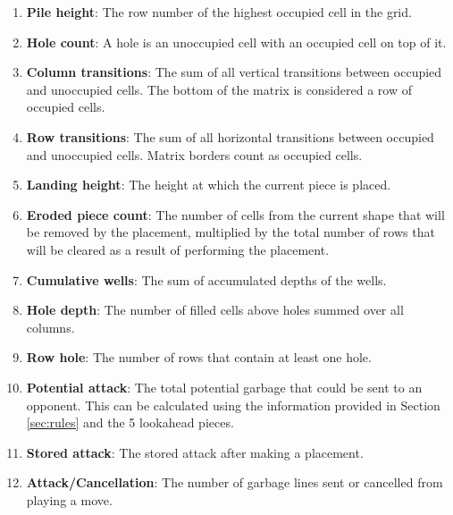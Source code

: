 \documentclass[a4paper, 12pt]{extreport}
\begin{document}
	\begin{enumerate}
		\item \textbf{Pile height}: The row number of the highest occupied cell in the grid.
		\item \textbf{Hole count}: A hole is an unoccupied cell with an occupied cell on top of it.
		\item \textbf{Column transitions}: The sum of all vertical transitions between occupied and unoccupied cells. The bottom of the matrix is considered a row of occupied cells.
		\item \textbf{Row transitions}: The sum of all horizontal transitions between occupied and unoccupied cells. Matrix borders count as occupied cells.
		\item \textbf{Landing height}: The height at which the current piece is placed.
		\item \textbf{Eroded piece count}: The number of cells from the current shape that will be removed by the placement, multiplied by the total number of rows that will be cleared as a result of performing the placement.
		\item \textbf{Cumulative wells}: The sum of accumulated depths of the wells.
		\item \textbf{Hole depth}: The number of filled cells above holes summed over all columns.
		\item \textbf{Row hole}: The number of rows that contain at least one hole.
		\item \textbf{Potential attack}: The total potential garbage that could be sent to an opponent. This can be calculated using the information provided in Section \ref{sec:rules} and the 5 lookahead pieces.
		\item \textbf{Stored attack}: The stored attack after making a placement.
		\item \textbf{Attack/Cancellation}: The number of garbage lines sent or cancelled from playing a move.
	\end{enumerate}
	
	
\end{document}
